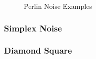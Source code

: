 \begin{figure}
	\center
	\caption{Perlin Noise Examples}
	\label{fig:perlinEg}
\end{figure}
\subsubsection{Simplex Noise}
\subsubsection{Diamond Square}
